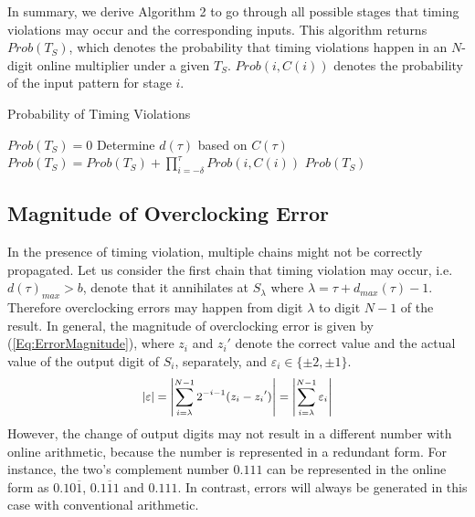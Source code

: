 \documentclass{acm_proc_article-sp}
\begin{document}
In summary, we derive Algorithm 2 to go through all possible stages that timing violations may occur and the corresponding inputs. This algorithm returns $Prob(T_S)$, which denotes the probability that timing violations happen in an $N$-digit online multiplier under a given $T_S$. $Prob(i,C(i))$ denotes the probability of the input pattern for stage $i$.
%
\begin{algorithm}[htbp]
  \caption{Probability of Timing Violations}
  \begin{algorithmic}[1]
    \STATE  $Prob(T_S)=0$
    \STATE  Determine $d(\tau)$ based on $C(\tau)$
    \STATE  $Prob(T_S)=Prob(T_S)+\prod_{i=-\delta}^{\tau}Prob(i,C(i))$
    \ENDIF
    \ENDFOR
    \RETURN $Prob(T_S)$
  \label{Algorithm:ProbabilityTimingViolation}
  \end{algorithmic}
\end{algorithm}

\subsection{Magnitude of Overclocking Error}
In the presence of timing violation, multiple chains might not be correctly propagated. Let us consider the first chain that timing violation may occur, i.e. $d(\tau)_{max}>b$, denote that it annihilates at $S_{\lambda}$ where $\lambda=\tau+d_{max}(\tau)-1$. Therefore overclocking errors may happen from digit $\lambda$ to digit $N-1$ of the result. In general, the magnitude of overclocking error is given by (\ref{Eq:ErrorMagnitude}), where $z_i$ and ${z_i}'$ denote the correct value and the actual value of the output digit of $S_i$, separately, and $\varepsilon_i\in\{\pm2,\pm1\}$.
%
\begin{eqnarray}\label{Eq:ErrorMagnitude}
\scriptsize
  \left|\varepsilon\right|=\left|\sum_{i=\lambda}^{N-1}2^{-i-1}(z_i-{z_i}')\right|=\left|\sum_{i=\lambda}^{N-1} \varepsilon_i\right|
\normalsize
\end{eqnarray}
%
However, the change of output digits may not result in a different number with online arithmetic, because the number is represented in a redundant form. For instance, the two's complement number $0.111$ can be represented in the online form as $0.10\overline{1}$, $0.1\overline{1}1$ and $0.111$. In contrast, errors will always be generated in this case with conventional arithmetic.


\end{document}

